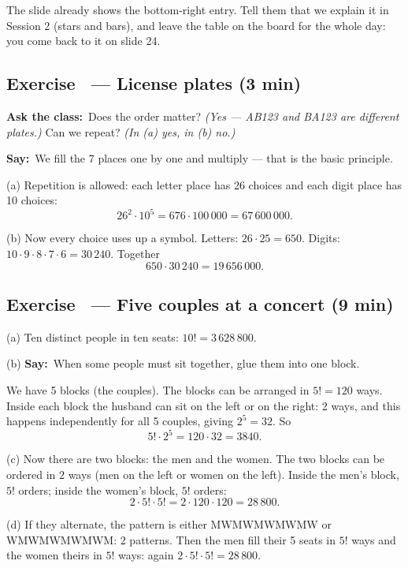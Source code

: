 \documentclass[11pt,a4paper,parskip=half]{scrartcl}
\newcommand{\say}{\textbf{\color{teal}Say:}\ }
\newcommand{\ask}{\textbf{\color{navy}Ask the class:}\ }
\newcommand{\slide}[1]{\marginpar{\raggedright\footnotesize\color{gray}slide #1}}
\begin{document}
\begin{cue}
	The slide already shows the bottom-right entry. Tell them that we explain
	it in Session 2 (stars and bars), and leave the table on the board for the
	whole day: you come back to it on slide 24.
\end{cue}

\subsection{Exercise~ --- License plates (3 min)}\slide{5}


\ask Does the order matter? \emph{(Yes --- AB123 and BA123 are different
	plates.)} Can we repeat? \emph{(In (a) yes, in (b) no.)}

\say We fill the 7 places one by one and multiply --- that is the basic
principle.

(a) Repetition is allowed: each letter place has 26 choices and each digit
place has 10 choices:
\[ 26^2\cdot 10^5 = 676\cdot 100\,000 = 67\,600\,000. \]

(b) Now every choice uses up a symbol. Letters: $26\cdot25 = 650$. Digits:
$10\cdot9\cdot8\cdot7\cdot6 = 30\,240$. Together
\[ 650\cdot 30\,240 = 19\,656\,000. \]

\subsection{Exercise~ --- Five couples at a concert (9 min)}\slide{6}


(a) Ten distinct people in ten seats: $10! = 3\,628\,800$.

(b) \say When some people must sit together, glue them into one block.

We have 5 blocks (the couples). The blocks can be arranged in $5! = 120$
ways. Inside each block the husband can sit on the left or on the right: 2
ways, and this happens independently for all 5 couples, giving $2^5 = 32$. So
\[ 5!\cdot 2^5 = 120\cdot 32 = 3840. \]

(c) Now there are two blocks: the men and the women. The two blocks can be
ordered in $2$ ways (men on the left or women on the left). Inside the men's
block, $5!$ orders; inside the women's block, $5!$ orders:
\[ 2\cdot5!\cdot5! = 2\cdot120\cdot120 = 28\,800. \]

(d) If they alternate, the pattern is either MWMWMWMWMW or WMWMWMWMWM: 2
patterns. Then the men fill their 5 seats in $5!$ ways and the women theirs in
$5!$ ways: again $2\cdot5!\cdot5! = 28\,800$.
\end{document}

